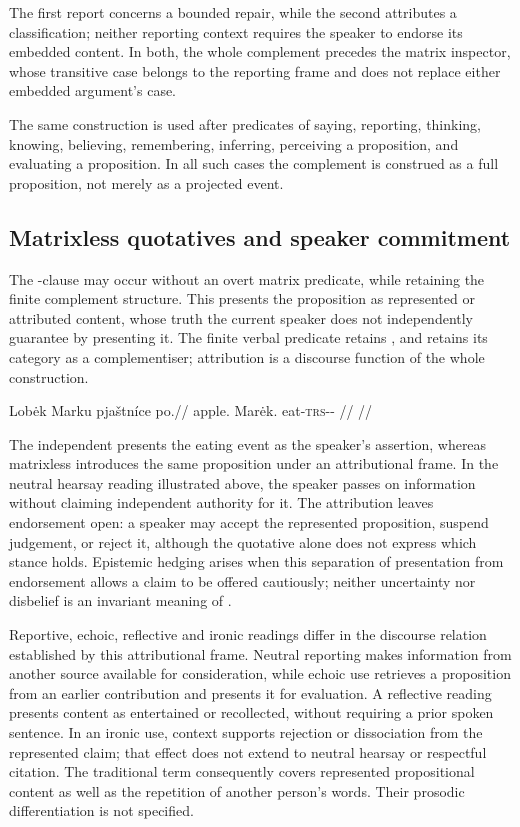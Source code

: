 The first report concerns a bounded repair, while the second attributes a
classification; neither reporting context requires the speaker to endorse
its embedded content. In both, the whole complement precedes the matrix
inspector, whose transitive case belongs to the reporting frame and does not
replace either embedded argument's case.

The same construction is used after predicates of saying, reporting,
thinking, knowing, believing, remembering, inferring, perceiving a
proposition, and evaluating a proposition. In all such cases the complement
is construed as a full proposition, not merely as a projected event.

\subsection{Matrixless quotatives and speaker commitment}
\label{sec:matrixless-quotative}

The -clause may occur without an overt matrix predicate, while
retaining the finite complement structure. This 
presents the proposition as represented or attributed content, whose truth
the current speaker does not independently guarantee by presenting it.
The finite verbal predicate retains , and  retains its
category as a complementiser; attribution is a discourse function of the
whole construction.

\ex
\begingl
\gla Lobėk Marku pjaštníce po.//
\glb apple.\Dir{} Marėk.\Trs{} eat-\textsc{trs}-\Pf{}-\Lnk{} \Compl{}//
\glft {}//
\endgl
\xe

The independent  presents the eating event as
the speaker's assertion, whereas matrixless 
introduces the same proposition under an attributional frame. In the neutral
hearsay reading illustrated above, the speaker passes on information without
claiming independent authority for it. The attribution leaves endorsement
open: a speaker may accept the represented proposition, suspend judgement,
or reject it, although the quotative alone does not express which stance
holds. Epistemic hedging arises when this separation of presentation from
endorsement allows a claim to be offered cautiously; neither uncertainty
nor disbelief is an invariant meaning of .

Reportive, echoic, reflective and ironic readings differ in the discourse
relation established by this attributional frame. Neutral reporting makes
information from another source available for consideration, while echoic
use retrieves a proposition from an earlier contribution and presents it
for evaluation. A reflective reading presents content as entertained or
recollected, without requiring a prior spoken sentence. In an ironic use,
context supports rejection or dissociation from the represented claim;
that effect does not extend to neutral hearsay or respectful citation.
The traditional term  consequently covers represented
propositional content as well as the repetition of another person's words.
Their prosodic differentiation is not specified.

